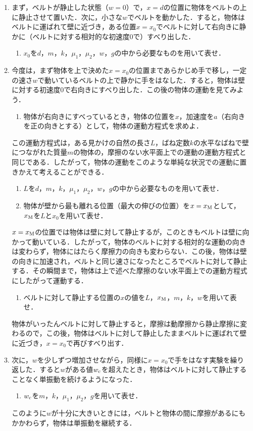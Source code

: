 \begin{enumerate}[A]
  \item {\hzw}まず，ベルトが静止した状態（$w = 0$）で，$x = d$の位置に物体をベルトの上に静止させて置いた．次に，小さな$w$でベルトを動かした．すると，物体はベルトに運ばれて壁に近づき，ある位置$x = x_0$でベルトに対して右向きに静かに（ベルトに対する相対的な初速度0で）すべり出した．
  \begin{enumerate}[(1)]
    \item {\hzw}$x_0$を$d$，$m$，$k$，$\mu_1$，$\mu_2$，$w$，$g$の中から必要なものを用いて表せ．
  \end{enumerate}
  \item {\hzw}今度は，まず物体を上で決めた$x = x_0$の位置まであらかじめ手で移し，一定の速さ$w$で動いているベルトの上で静かに手をはなした．すると，物体は壁に対する初速度0で右向きにすべり出した．この後の物体の運動を見てみよう．
  \begin{enumerate}[(1), resume]
    \item {\hzw}物体が右向きにすべっているとき，物体の位置を$x$，加速度を$a$（右向きを正の向きとする）として，物体の運動方程式を求めよ．
  \end{enumerate}
  {\hzw}この運動方程式は，ある見かけの自然の長さ$L$，ばね定数$k$の水平なばねで壁につながれた質量$m$の物体の，摩擦のない水平面上での運動の運動方程式と同じである．したがって，物体の運動をこのような単純な状況での運動に置きかえて考えることができる．
  \begin{enumerate}[(1), resume]
    \item {\hzw}$L$を$d$，$m$，$k$，$\mu_1$，$\mu_2$，$w$，$g$の中から必要なものを用いて表せ．
    \item {\hzw}物体が壁から最も離れる位置（最大の伸びの位置）を$x = x_\mathrm{M}$として，$x_\mathrm{M}$を$L$と$x_0$を用いて表せ．
  \end{enumerate}
  {\hzw}$x = x_\mathrm{M}$の位置では物体は壁に対して静止するが，このときもベルトは壁に向かって動いている．したがって，物体のベルトに対する相対的な運動の向きは変わらず，物体にはたらく摩擦力の向きも変わらない．この後，物体は壁の向きに加速され，ベルトと同じ速さになったところでベルトに対して静止する．その瞬間まで，物体は上で述べた摩擦のない水平面上での運動方程式にしたがって運動する．
  \begin{enumerate}[(1), resume]
    \item {\hzw}ベルトに対して静止する位置の$x$の値を$L$，$x_\mathrm{M}$，$m$，$k$，$w$を用いて表せ．
  \end{enumerate}
  {\hzw}物体がいったんベルトに対して静止すると，摩擦は動摩擦から静止摩擦に変わるので，この後，物体はベルトに対して静止したままベルトに運ばれて壁に近づき，$x = x_0$で再びすべり出す．
  \item {\hzw}次に，$w$を少しずつ増加させながら，同様に$x = x_0$で手をはなす実験を繰り返した．すると$w$がある値$w_\mathrm{c}$を超えたとき，物体はベルトに対して静止することなく単振動を続けるようになった．
  \begin{enumerate}[(1), resume]
    \item {\hzw}$w_\mathrm{c}$を$m$，$k$，$\mu_1$，$\mu_2$，$g$を用いて表せ．
  \end{enumerate}
  {\hzw}このように$w$が十分に大きいときには，ベルトと物体の間に摩擦があるにもかかわらず，物体は単振動を継続する．
\end{enumerate}
